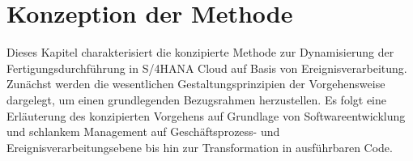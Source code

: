 \chapter{Konzeption der Methode}\label{ch:Methode}
Dieses Kapitel charakterisiert die konzipierte Methode zur Dynamisierung der Fertigungsdurchführung in S/4HANA Cloud auf Basis von Ereignisverarbeitung.
Zunächst werden die wesentlichen Gestaltungsprinzipien der Vorgehensweise dargelegt, um einen grundlegenden Bezugsrahmen herzustellen.
Es folgt eine Erläuterung des konzipierten Vorgehens auf Grundlage von Softwareentwicklung und schlankem Management auf Geschäftsprozess- und Ereignisverarbeitungsebene bis hin zur Transformation in ausführbaren Code.


